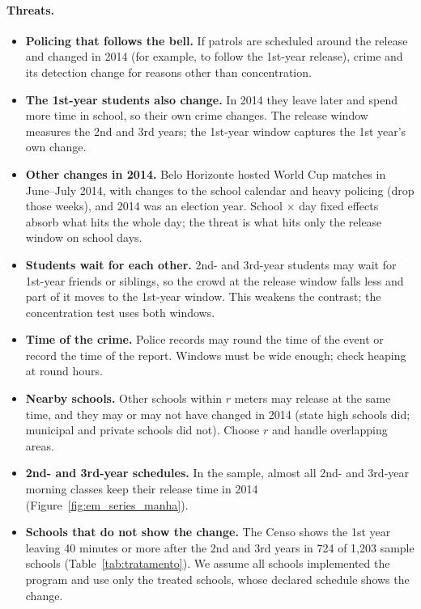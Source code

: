 \documentclass[11pt]{article}
\begin{document}
\paragraph{Threats.}
\begin{itemize}
  \item \textbf{Policing that follows the bell.} If patrols are scheduled
        around the release and changed in 2014 (for example, to follow the
        1st-year release), crime and its detection change for reasons other
        than concentration.
  \item \textbf{The 1st-year students also change.} In 2014 they leave later
        and spend more time in school, so their own crime changes. The release
        window measures the 2nd and 3rd years; the 1st-year window captures the
        1st year's own change.
  \item \textbf{Other changes in 2014.} Belo Horizonte hosted World Cup matches
        in June--July 2014, with changes to the school calendar and heavy
        policing (drop those weeks), and 2014 was an election year. School
        $\times$ day fixed effects absorb what hits the whole day; the threat
        is what hits only the release window on school days.
  \item \textbf{Students wait for each other.} 2nd- and 3rd-year students may
        wait for 1st-year friends or siblings, so the crowd at the release
        window falls less and part of it moves to the 1st-year window. This
        weakens the contrast; the concentration test uses both windows.
  \item \textbf{Time of the crime.} Police records may round the time of the
        event or record the time of the report. Windows must be wide enough;
        check heaping at round hours.
  \item \textbf{Nearby schools.} Other schools within $r$ meters may release
        at the same time, and they may or may not have changed in 2014 (state
        high schools did; municipal and private schools did not). Choose $r$
        and handle overlapping areas.
  \item \textbf{2nd- and 3rd-year schedules.} In the sample, almost all 2nd-
        and 3rd-year morning classes keep their release time in 2014
        (Figure~\ref{fig:em_series_manha}).
  \item \textbf{Schools that do not show the change.} The Censo shows the 1st
        year leaving 40 minutes or more after the 2nd and 3rd years in 724 of
        1,203 sample schools (Table~\ref{tab:tratamento}). We assume all
        schools implemented the program and use only the treated schools,
        whose declared schedule shows the change.
\end{itemize}
\end{document}
